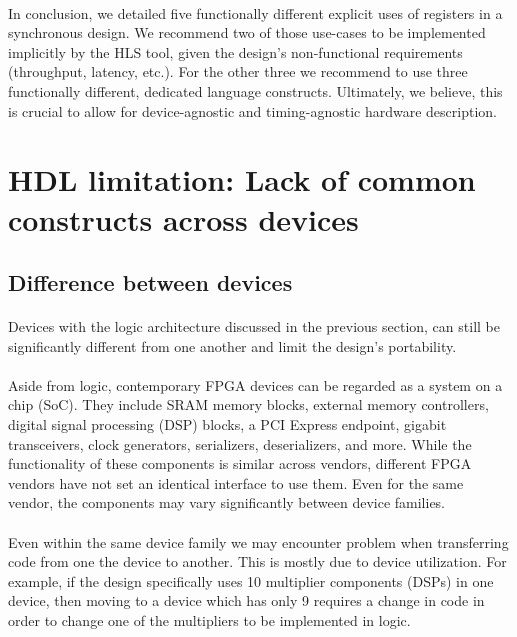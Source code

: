 \paragraph{}In conclusion, we detailed five functionally different explicit uses of registers in a synchronous design. We recommend two of those use-cases to be implemented implicitly by the HLS tool, given the design's non-functional requirements (throughput, latency, etc.). For the other three we recommend to use three functionally different, dedicated language constructs. Ultimately, we believe, this is crucial to allow for device-agnostic and timing-agnostic hardware description.
 

\section{HDL limitation: Lack of common constructs across devices}
\label{sec:limitation common constructs}
\subsection*{Difference between devices} 
\paragraph{}Devices with the logic architecture discussed in the previous section, can still be significantly different from one another and limit the design's portability.  
\paragraph{}Aside from logic, contemporary FPGA devices can be regarded as a system on a chip (SoC). They include SRAM memory blocks, external memory controllers, digital signal processing (DSP) blocks, a PCI Express endpoint, gigabit transceivers, clock generators, serializers, deserializers, and more. While the functionality of these components is similar across vendors, different FPGA vendors have not set an identical interface to use them. Even for the same vendor, the components may vary significantly between device families. 
\paragraph{}Even within the same device family we may encounter problem when transferring code from one the device to another. This is mostly due to device utilization. For example, if the design specifically uses 10 multiplier components (DSPs) in one device, then moving to a device which has only 9 requires a change in code in order to change one of the multipliers to be implemented in logic. 

